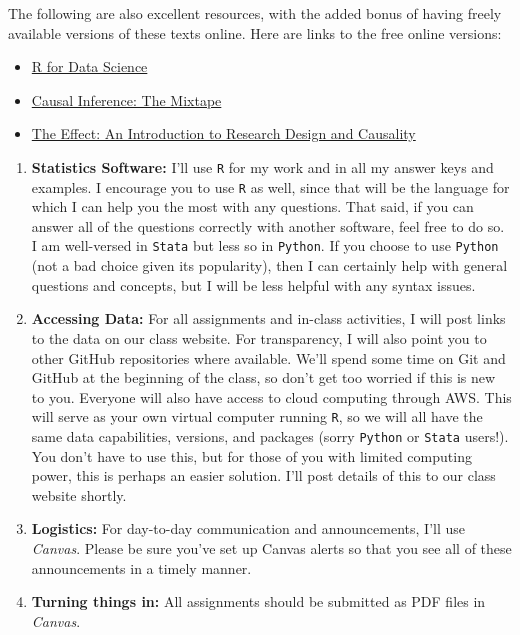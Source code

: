 \documentclass[11pt,]{article}
\providecommand{\tightlist}{%
  \setlength{\itemsep}{0pt}\setlength{\parskip}{0pt}}
\begin{document}
The following are also excellent resources, with the added bonus of
having freely available versions of these texts online. Here are links
to the free online versions:

\begin{itemize}
\tightlist
\item
  \href{https://r4ds.had.co.nz/}{R for Data Science}
\item
  \href{https://mixtape.scunning.com/}{Causal Inference: The Mixtape}
\item
  \href{https://theeffectbook.net/}{The Effect: An Introduction to
  Research Design and Causality}
\end{itemize}

\begin{enumerate}
\def\labelenumi{\arabic{enumi}.}
\setcounter{enumi}{2}
\item
  \textbf{Statistics Software:} I'll use \texttt{R} for my work and in
  all my answer keys and examples. I encourage you to use \texttt{R} as
  well, since that will be the language for which I can help you the
  most with any questions. That said, if you can answer all of the
  questions correctly with another software, feel free to do so. I am
  well-versed in \texttt{Stata} but less so in \texttt{Python}. If you
  choose to use \texttt{Python} (not a bad choice given its popularity),
  then I can certainly help with general questions and concepts, but I
  will be less helpful with any syntax issues.
\item
  \textbf{Accessing Data:} For all assignments and in-class activities,
  I will post links to the data on our class website. For transparency,
  I will also point you to other GitHub repositories where available.
  We'll spend some time on Git and GitHub at the beginning of the class,
  so don't get too worried if this is new to you. Everyone will also
  have access to cloud computing through AWS. This will serve as your
  own virtual computer running \texttt{R}, so we will all have the same
  data capabilities, versions, and packages (sorry \texttt{Python} or
  \texttt{Stata} users!). You don't have to use this, but for those of
  you with limited computing power, this is perhaps an easier solution.
  I'll post details of this to our class website shortly.
\item
  \textbf{Logistics:} For day-to-day communication and announcements,
  I'll use \emph{Canvas}. Please be sure you've set up Canvas alerts so
  that you see all of these announcements in a timely manner.
\item
  \textbf{Turning things in:} All assignments should be submitted as PDF
  files in \emph{Canvas}.
\end{enumerate}
\end{document}
